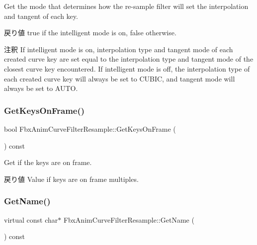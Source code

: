 Get the mode that determines how the re-\/sample filter will set the interpolation and tangent of each key. \begin{DoxyReturn}{戻り値}
{\ttfamily true} if the intelligent mode is on, {\ttfamily false} otherwise. 
\end{DoxyReturn}
\begin{DoxyRemark}{注釈}
If intelligent mode is on, interpolation type and tangent mode of each created curve key are set equal to the interpolation type and tangent mode of the closest curve key encountered. If intelligent mode is off, the interpolation type of each created curve key will always be set to C\+U\+B\+IC, and tangent mode will always be set to A\+U\+TO. 
\end{DoxyRemark}
\mbox{\label{class_fbx_anim_curve_filter_resample_af91489566c2c8445995dd265648646ea}} 
\subsubsection{\texorpdfstring{Get\+Keys\+On\+Frame()}{GetKeysOnFrame()}}
{\footnotesize\ttfamily bool Fbx\+Anim\+Curve\+Filter\+Resample\+::\+Get\+Keys\+On\+Frame (\begin{DoxyParamCaption}{ }\end{DoxyParamCaption}) const}

Get if the keys are on frame. \begin{DoxyReturn}{戻り値}
Value if keys are on frame multiples. 
\end{DoxyReturn}
\mbox{\label{class_fbx_anim_curve_filter_resample_a67303296eba915d2a9fde63c2557c3f9}} 
\subsubsection{\texorpdfstring{Get\+Name()}{GetName()}}
{\footnotesize\ttfamily virtual const char$\ast$ Fbx\+Anim\+Curve\+Filter\+Resample\+::\+Get\+Name (\begin{DoxyParamCaption}{ }\end{DoxyParamCaption}) const\hspace{0.3cm}{\ttfamily [virtual]}}

